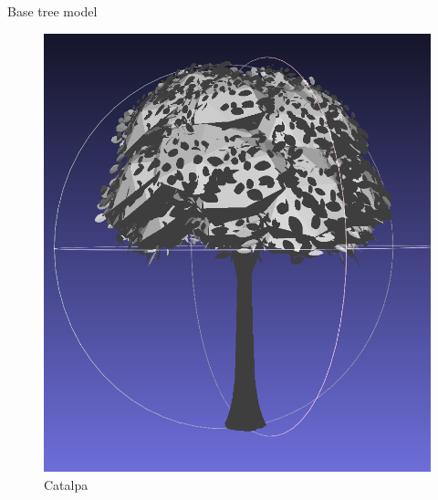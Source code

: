 \documentclass[12pt]{beamer}
\begin{document}
\begin{frame}{Base tree model}
\begin{figure}[H]
\begin{minipage}{0.24\textwidth}
        \includegraphics[width=\textwidth]{images/catalpa.png}
        \caption{Catalpa}
    \end{minipage}
\end{figure}


\end{frame}
\end{document}
